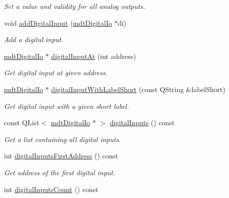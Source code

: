 \begin{DoxyCompactItemize}
\begin{DoxyCompactList}\small\item\em Set a value and validity for all analog outputs. \end{DoxyCompactList}\item 
void \hyperlink{classmdt_device_ios_a023571f5d77bd0874c08b53890a56381}{addDigitalInput} (\hyperlink{classmdt_digital_io}{mdtDigitalIo} $\ast$di)
\begin{DoxyCompactList}\small\item\em Add a digital input. \end{DoxyCompactList}\item 
\hyperlink{classmdt_digital_io}{mdtDigitalIo} $\ast$ \hyperlink{classmdt_device_ios_a78f68d0efeac0a23628f133121f28df8}{digitalInputAt} (int address)
\begin{DoxyCompactList}\small\item\em Get digital input at given address. \end{DoxyCompactList}\item 
\hyperlink{classmdt_digital_io}{mdtDigitalIo} $\ast$ \hyperlink{classmdt_device_ios_abcde6de5a0ca6d642af04c21250d6555}{digitalInputWithLabelShort} (const QString \&labelShort)
\begin{DoxyCompactList}\small\item\em Get digital input with a given short label. \end{DoxyCompactList}\item 
const QList$<$ \hyperlink{classmdt_digital_io}{mdtDigitalIo} $\ast$ $>$ \hyperlink{classmdt_device_ios_adb2cbcd4adcee1e9434634694ee1ae24}{digitalInputs} () const 
\begin{DoxyCompactList}\small\item\em Get a list containing all digital inputs. \end{DoxyCompactList}\item 
\hypertarget{classmdt_device_ios_a24e300fab861c054e6c61511fcff76c4}{
int \hyperlink{classmdt_device_ios_a24e300fab861c054e6c61511fcff76c4}{digitalInputsFirstAddress} () const }
\label{classmdt_device_ios_a24e300fab861c054e6c61511fcff76c4}

\begin{DoxyCompactList}\small\item\em Get address of the first digital input. \end{DoxyCompactList}\item 
\hypertarget{classmdt_device_ios_a8d6306c16a25c82d6d8002020f4dc16a}{
int \hyperlink{classmdt_device_ios_a8d6306c16a25c82d6d8002020f4dc16a}{digitalInputsCount} () const }
\label{classmdt_device_ios_a8d6306c16a25c82d6d8002020f4dc16a}


\end{DoxyCompactItemize}
